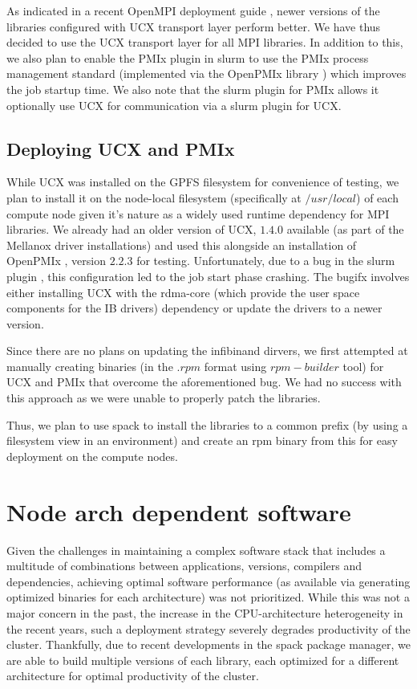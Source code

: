 \documentclass[sigconf,authordraft]{acmart}
\begin{document}
As indicated in a recent OpenMPI deployment guide \cite{openmpi_deployment_tuning}, newer versions of the libraries configured with UCX transport layer perform better. We have thus  decided to use the UCX transport layer for all MPI libraries. In addition to this, we also plan to enable the PMIx plugin \cite{slurm_pmix_sc17,slurm_pmix_2019} in slurm to use the PMIx process management standard \cite{pmix,pmix_website} (implemented via the OpenPMIx library \cite{openpmix_website}) which improves the job startup time. We also note that the slurm plugin for PMIx allows it optionally use UCX for communication via a slurm plugin for UCX.

\subsection{Deploying UCX and PMIx}
While UCX was installed on the GPFS filesystem for convenience of testing, we plan to install it on the node-local filesystem (specifically at $/usr/local$) of each compute node given it's nature as a widely used runtime dependency for MPI libraries. We already had an older version of UCX, $1.4.0$ available (as part of the Mellanox driver installations) and used this alongside an installation of OpenPMIx \cite{openpmix_website}, version $2.2.3$ for testing. Unfortunately, due to a bug in the slurm plugin \cite{slurm_ucx_bug}, this configuration led to the job start phase crashing. The bugifx involves either installing UCX with the rdma-core \cite{rdmacore_repository}(which provide the user space components for the IB drivers) dependency or update the drivers to a newer version.

Since there are no plans on updating the infibinand dirvers, we first attempted at manually creating binaries (in the $.rpm$ format using $rpm-builder$ tool) for UCX and PMIx that overcome the aforementioned bug. We had no success with this approach as we were unable to properly patch the libraries.

Thus, we plan to use spack \cite{spack} to install the libraries to a common prefix (by using a filesystem view in an environment) and create an rpm binary from this for easy deployment on the compute nodes.

\section{Node arch dependent software}

Given the challenges in maintaining a complex software stack that includes a multitude of combinations between applications, versions, compilers and dependencies, achieving optimal software performance (as available via generating optimized binaries for each architecture) was not prioritized. While this was not a major concern in the past, the increase in the CPU-architecture heterogeneity in the recent years, such a deployment strategy severely degrades productivity of the cluster. Thankfully, due to recent developments in the spack package manager, we are able to build multiple versions of each library, each optimized for a different architecture for optimal productivity of the cluster. 
\end{document}
